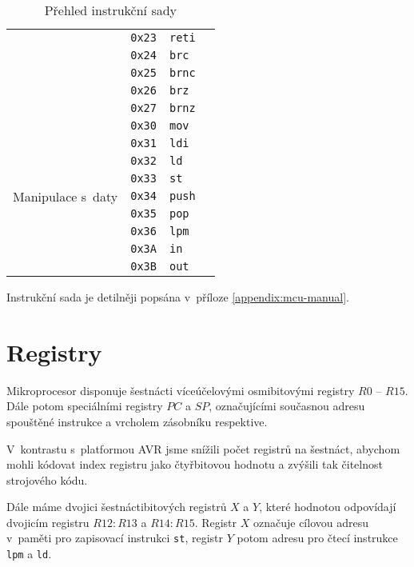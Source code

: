\begin{table}[htbp]
\begin{center}
\begin{tabular}{| l | l | l | l |}
                         & \texttt{0x23} & \texttt{reti} \\
                         & \texttt{0x24} & \texttt{brc} \\
                         & \texttt{0x25} & \texttt{brnc} \\
                         & \texttt{0x26} & \texttt{brz} \\
                         & \texttt{0x27} & \texttt{brnz} \\
\hline
\multirow{9}{*}{Manipulace s~daty} & \texttt{0x30} & \texttt{mov} \\
                                   & \texttt{0x31} & \texttt{ldi} \\
                                   & \texttt{0x32} & \texttt{ld} \\
                                   & \texttt{0x33} & \texttt{st} \\
                                   & \texttt{0x34} & \texttt{push} \\
                                   & \texttt{0x35} & \texttt{pop} \\
                                   & \texttt{0x36} & \texttt{lpm} \\
                                   & \texttt{0x3A} & \texttt{in} \\
                                   & \texttt{0x3B} & \texttt{out} \\
\hline
\end{tabular}
\end{center}
\caption{Přehled instrukční sady}
\label{tbl:instruction-set}
\end{table}

Instrukční sada je detilněji popsána v~příloze \ref{appendix:mcu-manual}.

\section{Registry}

Mikroprocesor disponuje šestnácti víceúčelovými osmibitovými registry \( R0 \) -- \( R15 \). Dále potom speciálními registry \( PC \) a \( SP \), označujícími současnou adresu spouštěné instrukce a vrcholem zásobníku respektive.

V~kontrastu s~platformou AVR jsme snížili počet registrů na šestnáct, abychom mohli kódovat index registru jako čtyřbitovou hodnotu a zvýšili tak čitelnost strojového kódu.

Dále máme dvojici šestnáctibitových registrů $X$ a $Y$, které hodnotou odpovídají dvojicím registru $R12:R13$ a $R14:R15$. Registr $X$ označuje cílovou adresu v~paměti pro zapisovací instrukci \texttt{st}, registr $Y$ potom adresu pro čtecí instrukce \texttt{lpm} a \texttt{ld}.

